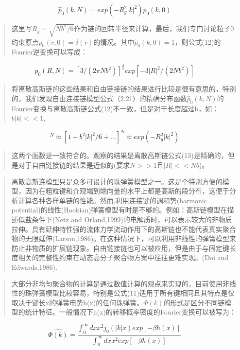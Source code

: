 			\begin{equation}
			\hat{p}_{0}(k,N)=exp(-R_{g}^2|k|^2)\hat{p}_{0}(k,0)
			\end{equation}
			\begin{quotation}
				这里写$R_{g}=\sqrt{Nb^2/6}$作为链的回转半径来计算，最后，我们专门讨论粒子0约束原点$p_{0}(r,0)=\delta(r)$的情况。其中$\hat{p}_{0}(k,0)=1$，则公式(12)的Fourier逆变换可以写成：
			\end{quotation}
			\begin{equation}
			p_{0}(R,N)=[3/(2\pi Nb^2)]^\frac{3}{2}exp[-3|R|^2/(2Nb^2)]
			\end{equation}
			\begin{quotation}
				将离散高斯链的这些结果和自由链接链的结果进行比较是很有意思的，特别的，我们发现自由连接链模型公式（2.21）的精确分布函数$\hat{p}_{0}(k,N)$的Fourier变换与离散高斯链公式(12)不一致，但是对于长度超过b，如：$b|k|<<1$,
			\end{quotation}
			\begin{equation}
			[j_{0}(b|k|)]^N\approx [1-b^2|k|^2/6+\dots]^N\approx exp(-R_{g}^2|k|^2)
			\end{equation}
			\begin{quotation}
				这两个函数是一致符合的。观察的结果是离散高斯链公式(13)是精确的，但是对于自由链接链的结果是近似的(要求$N>>1$且$|R|<<Nb$)。
			\end{quotation}
			\begin{quotation}
				离散高斯连模型只是众多可设计的珠弹簧模型之一。这是个特别方便的模型，因为在粗粒键和介观端到端向量的水平上都是高斯的段分布，这便于分析计算各种各样单链的性能。然而,利用连接键的调和势(harmonic potential)的线性(Hookian)弹簧模型有时是不够的。例如：高斯链模型在描述低盐条件下(Netz and Orland,1999)的电解质时，可以表示较大的非物质拉伸。具有延伸特性强的流体力学流动作用下的高斯链也不能代表真实聚合物的无限延伸(Larson,1986)。在这种情况下，可以利用非线性的弹簧模型来防止非物质的扩展链现象。自由链接链也可以被应用，但是由于与固定键长度相关的完整性约束在动态高分子聚合物方案中往往更难实现。(Doi and Edwards,1986).
			\end{quotation}
			\begin{quotation}
				大部分非均匀聚合物的计算是通过数值计算的观点来实现的，目前使用非线性的珠弹簧模型比较容易，特别是公式(11)适用于所有键相同且其特点是仅取决于键长x的弹簧电势h(x)的任何珠弹簧。$\varPhi(k)
				$的形式是区分不同链模型的统计特征。一般情况下h(x)的转移概率密度的Fourier变换可以被写为：
			\end{quotation}
			\begin{equation}
			\hat{\varPhi(k)}=\frac{\int_{0}^{\infty} dx x^2j_{0}(|k|x)exp[-\beta h(x)]}{\int_{0}^{\infty} dx x^2exp[-\beta h(x)]} 
			\end{equation}
